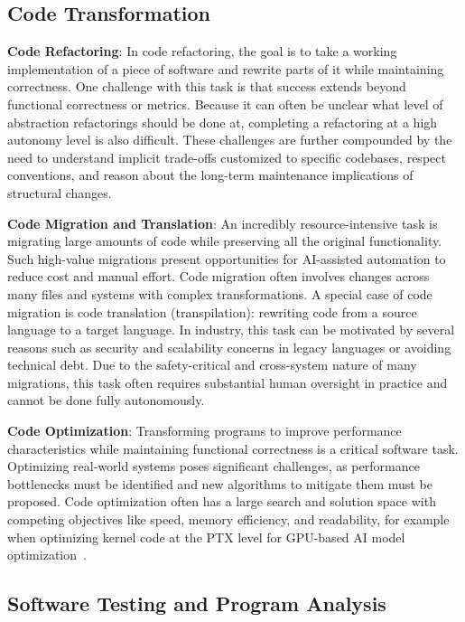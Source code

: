 \subsection{Code Transformation}

\textbf{Code Refactoring}: In code refactoring, the goal is to take a working implementation of a piece of software and rewrite parts of it while maintaining correctness. One challenge with this task is that success extends beyond functional correctness or metrics. Because it can often be unclear what level of abstraction refactorings should be done at, completing a refactoring at a high autonomy level is also difficult. These challenges are further compounded by the need to understand implicit trade-offs customized to specific codebases, respect conventions, and reason about the long-term maintenance implications of structural changes. 

\textbf{Code Migration and Translation}: An incredibly resource-intensive task is migrating large amounts of code while preserving all the original functionality. Such high-value migrations present opportunities for AI-assisted automation to reduce cost and manual effort. Code migration often involves changes across many files and systems with complex transformations. A special case of code migration is code translation (transpilation): rewriting code from a source language to a target language. In industry, this task can be motivated by several reasons such as security and scalability concerns in legacy languages or avoiding technical debt. Due to the safety-critical and cross-system nature of many migrations, this task often requires substantial human oversight in practice and cannot be done fully autonomously. 

\textbf{Code Optimization}: Transforming programs to improve performance characteristics while maintaining functional correctness is a critical software task. Optimizing real-world systems poses significant challenges, as performance bottlenecks must be identified and new algorithms to mitigate them must be proposed. Code optimization often has a large search and solution space with competing objectives like speed, memory efficiency, and readability, for example when optimizing kernel code at the PTX level for GPU-based AI model optimization~\citep{deepep2025, ouyang2024kernelbench}. 

\subsection{Software Testing and Program Analysis}

